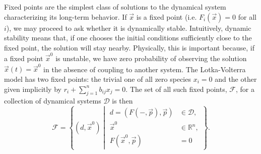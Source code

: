 Fixed points are the simplest class of solutions to the dynamical system characterizing its long-term behavior. If $\vec x$ is a fixed point (i.e. $F_i(\vec{x})=0$ for all $i$), we
may proceed to ask whether it is dynamically stable.
Intuitively, dynamic stability means that, if one chooses the initial
conditions sufficiently close to the fixed point, the solution will
stay nearby.  Physically, this is important because,
if a fixed point ${\vec x}^0$ is unstable, we have zero probability of
observing the solution ${\vec x}(t) = {\vec x}^0$ in the absence of coupling to another system. The Lotka-Volterra model has two fixed points: the trivial one of all zero species $x_i=0$ and the other given implicitly by $r_i + \sum_{j=1}^{n} b_{ij} x_j = 0$. The set of all such fixed points, $\mathcal{F}$, for a collection of dynamical systems $\mathcal{D}$ is then
\begin{equation}\label{eq:setfixedpoints}
\mathcal{F} = \left\{ (d,\vec{x}^0) \; \left| \;
\begin{aligned}
d = (F(-,\vec{p}),\vec{p}) &\in \mathcal{D}, \\
\vec{x}^0 &\in \mathbb{R}^n,\\
F(\vec{x}^0,\vec{p}) &= 0
\end{aligned}
\right.
\right\}.
\end{equation}

